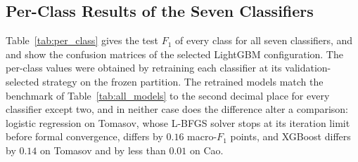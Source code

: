 \subsection{Per-Class Results of the Seven Classifiers}
\label{sec:resPerClass}
Table~\ref{tab:per_class} gives the test $F_1$ of every class for all seven classifiers, and  and  show the confusion matrices of the selected LightGBM configuration. The per-class values were obtained by retraining each classifier at its validation-selected strategy on the frozen partition. The retrained models match the benchmark of Table~\ref{tab:all_models} to the second decimal place for every classifier except two, and in neither case does the difference alter a comparison: logistic regression on Tomasov, whose L-BFGS solver stops at its iteration limit before formal convergence, differs by $0.16$ macro-$F_1$ points, and XGBoost differs by $0.14$ on Tomasov and by less than $0.01$ on Cao.

